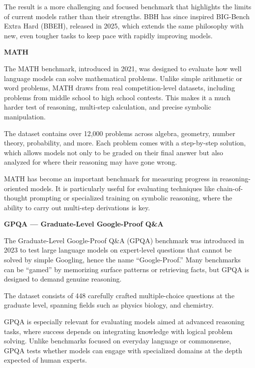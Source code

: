 The result is a more challenging and focused benchmark that highlights the limits of current models rather than their strengths. BBH has since
inspired BIG-Bench Extra Hard (BBEH), released in 2025, which extends the same philosophy with new, even tougher tasks to keep pace with rapidly
improving models.

\textbf{MATH}


The MATH benchmark, introduced in 2021, was designed to evaluate how well language models can solve mathematical problems. Unlike simple arithmetic
or word problems, MATH draws from real competition-level datasets, including problems from middle school to high school contests. This makes it a
much harder test of reasoning, multi-step calculation, and precise symbolic manipulation.

The dataset contains over 12,000 problems across algebra, geometry, number theory, probability, and more. Each problem comes with a step-by-step
solution, which allows models not only to be graded on their final answer but also analyzed for where their reasoning may have gone wrong.

MATH has become an important benchmark for measuring progress in reasoning-oriented models. It is particularly useful for evaluating techniques
like chain-of-thought prompting or specialized training on symbolic reasoning, where the ability to carry out multi-step derivations is key.

\textbf{GPQA — Graduate-Level Google-Proof Q\&A}


The Graduate-Level Google-Proof Q\&A (GPQA) benchmark was introduced in 2023 to test large language models on expert-level questions that cannot
be solved by simple Googling, hence the name “Google-Proof.” Many benchmarks can be “gamed” by memorizing surface patterns or retrieving facts,
but GPQA is designed to demand genuine reasoning.

The dataset consists of 448 carefully crafted multiple-choice questions at the graduate level, spanning fields such as
physics biology, and chemistry.

GPQA is especially relevant for evaluating models aimed at advanced reasoning tasks, where success depends on integrating knowledge with
logical problem solving. Unlike benchmarks focused on everyday language or commonsense, GPQA tests whether models can engage with specialized
domains at the depth expected of human experts.

